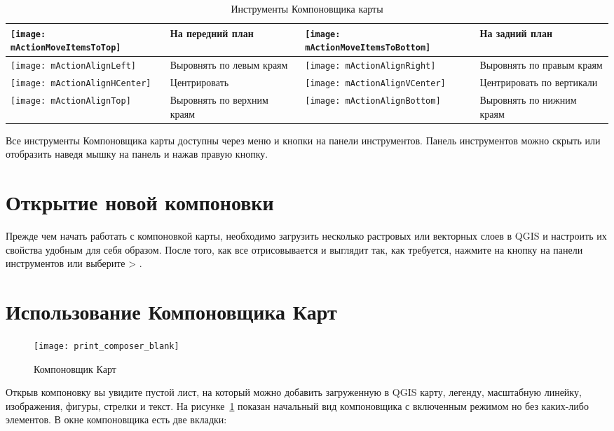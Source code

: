 \begin{table}[h]
\begin{tabular}{|m{1cm}|m{5.4cm}|m{1cm}|m{5.4cm}|}
 \hline \texttt{[image: mActionMoveItemsToTop]} & На передний
 план &
 \texttt{[image: mActionMoveItemsToBottom]} & На задний
 план \\
 \hline \texttt{[image: mActionAlignLeft]} & Выровнять по
 левым краям &
 \texttt{[image: mActionAlignRight]} & Выровнять по правым
 краям \\
 \hline \texttt{[image: mActionAlignHCenter]} & Центрировать &
 \texttt{[image: mActionAlignVCenter]} & Центрировать по
 вертикали \\
 \hline \texttt{[image: mActionAlignTop]} & Выровнять по верхним
 краям &
 \texttt{[image: mActionAlignBottom]} & Выровнять по нижним
 краям \\
\hline
\end{tabular}
\caption{Инструменты Компоновщика карты}\label{tab:printcomposer_tools}
\end{table}

Все инструменты Компоновщика карты доступны через меню и кнопки на
панели инструментов. Панель инструментов можно скрыть или отобразить
наведя мышку на панель и нажав правую кнопку.

\section{Открытие новой компоновки}\label{composertemplates}

Прежде чем начать работать с компоновкой карты, необходимо загрузить
несколько растровых или векторных слоев в QGIS и настроить их свойства
удобным для себя образом. После того, как все отрисовывается и выглядит
так, как требуется, нажмите на кнопку
 на панели
инструментов или выберите  >
.

\section{Использование Компоновщика Карт}\label{label_useprintcomposer}

\begin{figure}[ht]
   \centering
   \texttt{[image: print\_composer\_blank]}
   \caption{Компоновщик Карт \nixcaption}\label{fig:print_composer_blank}
\end{figure}

Открыв компоновку вы увидите пустой лист, на который можно добавить
загруженную в QGIS карту, легенду, масштабную линейку, изображения,
фигуры, стрелки и текст. На рисунке~\ref{fig:print_composer_blank}
показан начальный вид компоновщика с включенным режимом
 но без каких-либо элементов. В окне
компоновщика есть две вкладки:

